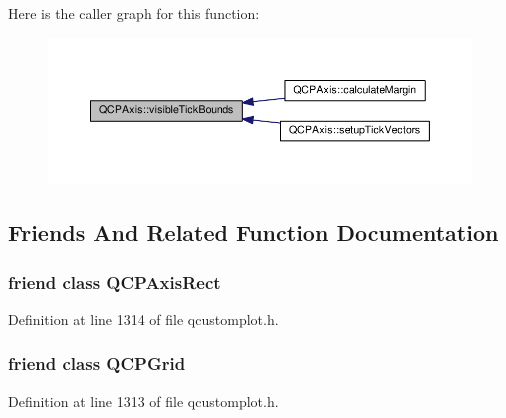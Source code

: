 Here is the caller graph for this function\+:\nopagebreak
\begin{figure}[H]
\begin{center}
\leavevmode
\includegraphics[width=350pt]{class_q_c_p_axis_a06320a944d1120732cc0d72fe1306d8b_icgraph}
\end{center}
\end{figure}




\subsection{Friends And Related Function Documentation}
\hypertarget{class_q_c_p_axis_acbf20ecb140f66c5fd1bc64ae0762990}{}
\subsubsection[{Q\+C\+P\+Axis\+Rect}]{\setlength{\rightskip}{0pt plus 5cm}friend class {\bf Q\+C\+P\+Axis\+Rect}\hspace{0.3cm}{\ttfamily [friend]}}\label{class_q_c_p_axis_acbf20ecb140f66c5fd1bc64ae0762990}


Definition at line 1314 of file qcustomplot.\+h.

\hypertarget{class_q_c_p_axis_a061e177f585549fc31f780852e2bd6fe}{}
\subsubsection[{Q\+C\+P\+Grid}]{\setlength{\rightskip}{0pt plus 5cm}friend class {\bf Q\+C\+P\+Grid}\hspace{0.3cm}{\ttfamily [friend]}}\label{class_q_c_p_axis_a061e177f585549fc31f780852e2bd6fe}


Definition at line 1313 of file qcustomplot.\+h.

